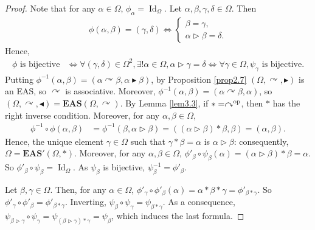 \documentclass[10pt,a4paper]{amsart}
\numberwithin{equation}{section}
\newcommand{\eas}{\mathbf{EAS}}
\begin{document}
\begin{proof}
Note that for any $\alpha \in \Omega$, $\phi_\alpha=\operatorname{Id}_\Omega$. Let $\alpha,\beta,\gamma,\delta\in \Omega$. Then
\begin{align*}
\phi(\alpha,\beta)=(\gamma,\delta) \Longleftrightarrow \begin{cases}
\beta=\gamma,\\
\alpha\triangleright \beta=\delta.
\end{cases}\end{align*}
Hence,
\begin{align*}
\phi\text{ is bijective}&\Longleftrightarrow\forall (\gamma,\delta)\in \Omega^2, \exists! \alpha \in \Omega, \alpha \triangleright\gamma=\delta\Longleftrightarrow\forall\gamma \in \Omega, \psi_\gamma\text{ is bijective}.
\end{align*}
Putting $\phi^{-1}(\alpha,\beta)=(\alpha\curvearrowright \beta,\alpha \blacktriangleright \beta)$, by Proposition \ref{prop2.7} $(\Omega,\curvearrowright,\blacktriangleright)$ is an EAS, so $\curvearrowright$ is associative.
Moreover, $\phi^{-1}(\alpha,\beta)=(\alpha \curvearrowright \beta,\alpha)$, so $(\Omega,\curvearrowright,\blacktriangleleft)=\eas(\Omega,\curvearrowright)$.
By Lemma \ref{lem3.3}, if $*=\curvearrowright^{\rm op}$, then $*$ has the right inverse condition. Moreover, for any $\alpha,\beta \in \Omega$,
\begin{align*}
\phi^{-1}\circ \phi(\alpha,\beta)&=\phi^{-1}(\beta,\alpha \triangleright \beta)=((\alpha \triangleright \beta)*\beta,\beta)=(\alpha,\beta).
\end{align*}
Hence, the unique element $\gamma \in \Omega$ such that $\gamma*\beta=\alpha$ is $\alpha \triangleright \beta$: consequently, $\Omega=\eas'(\Omega,*)$. Moreover, for any $\alpha,\beta \in \Omega$,
$\phi'_\beta \circ \psi_\beta(\alpha)=(\alpha\triangleright \beta) *\beta=\alpha$.
So $\phi'_\beta\circ \psi_\beta=\operatorname{Id}_\Omega$. As $\psi_\beta$ is bijective, $\psi_\beta^{-1}=\phi'_\beta$.

Let $\beta,\gamma\in \Omega$. Then, for any $\alpha \in \Omega$,
$\phi'_\gamma \circ \phi'_\beta(\alpha)=\alpha *\beta*\gamma=\phi'_{\beta*\gamma}$.
So $\phi'_\gamma\circ \phi'_\beta=\phi'_{\beta*\gamma}$. Inverting, $\psi_\beta\circ \psi_\gamma=\psi_{\beta*\gamma}$. As a consequence,
$\psi_{\beta \triangleright \gamma}\circ \psi_\gamma=\psi_{(\beta \triangleright \gamma)*\gamma}=\psi_\beta$,
which induces the last formula. \end{proof}
\end{document}
